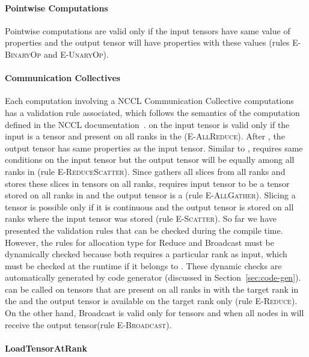 \paragraph{Pointwise Computations} Pointwise computations are valid only if the input tensors have same value of properties and the output tensor will have properties with these values (rules \textsc{E-BinaryOp} and \textsc{E-UnaryOp}).

\paragraph{Communication Collectives} Each computation involving a NCCL Communication Collective computations has a validation rule associated, which follows the semantics of the computation defined in the NCCL documentation~\cite{}.
\allreduce on the input tensor is valid only if the input is a \complete tensor and present on all ranks in the \WORLD (\textsc{E-AllReduce}). After \allreduce, the output tensor has same properties as the input tensor.
Similar to \allreduce, \reducescatter requires same conditions on the input tensor but the output tensor will be equally \sliced among all ranks in \WORLD (rule \textsc{E-ReduceScatter}).
Since \allgather gathers all slices from all ranks and stores these slices in \complete tensors on all ranks, \allgather requires input tensor to be a \sliced tensor stored on all ranks in \WORLD and the output tensor is a \complete (rule \textsc{E-AllGather}).
Slicing a tensor is possible only if it is continuous and the output tensor is stored on all ranks where the input tensor was stored (rule \textsc{E-Scatter}).
So far we have presented the validation rules that can be checked during the compile time.
However, the rules for allocation type for Reduce and Broadcast must be dynamically checked because both requires a particular rank as input, which must be checked at the runtime if it belongs to \WORLD.
These dynamic checks are automatically generated by \tool code generator (discussed in Section~\ref{sec:code-gen}).
\reduce can be called on tensors that are present on all ranks in \WORLD with the target rank in the \WORLD and the output tensor is available on the target rank only (rule \textsc{E-Reduce}).
On the other hand, Broadcast is valid only for \complete tensors and when all nodes in \WORLD will receive the output tensor(rule \textsc{E-Broadcast}).

\paragraph{LoadTensorAtRank}

